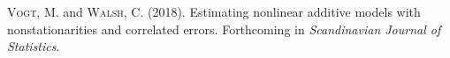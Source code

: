 \documentclass[a4paper,12pt]{article}
\begin{document}
\vspace{0.1cm}

\hangindent=0.5cm \textsc{Vogt, M.} and \textsc{Walsh, C.} (2018). Estimating nonlinear additive models with nonstationarities and correlated errors. Forthcoming in \textit{Scandinavian Journal of Statistics}. 






\end{document}
